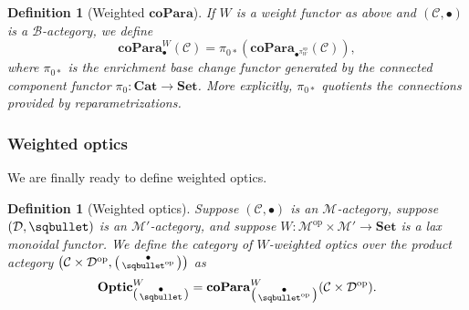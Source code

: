\documentclass[12pt,a4paper,openright,twoside]{report}
\theoremstyle{plain}
\newtheorem{definition}[proposition]{Definition}
\theoremstyle{definition}
\begin{document}
\begin{definition}[Weighted $\mathbf{coPara}$]
  If $W$ is a weight functor as above and $(\mathcal{C}, \bullet)$ is a $\mathcal{B}$-actegory, we define
  \[\mathbf{coPara}^W_{\bullet}(\mathcal{C}) = \pi_{0*}(\mathbf{coPara}_{\bullet^{\pi_W^{\mathrm{op}}}}(\mathcal{C})),\]
  where $\pi_{0*}$ is the enrichment base change functor generated by the connected component functor $\pi_{0}: \mathbf{Cat} \to \mathbf{Set}$. More explicitly, $\pi_{0*}$ quotients the connections provided by reparametrizations.
\end{definition}



\subsubsection{Weighted optics}

We are finally ready to define weighted optics.

\begin{definition}[Weighted optics]
  Suppose $(\mathcal{C}, \bullet)$ is an $\mathcal{M}$-actegory, suppose $(\mathcal{D}, \sqbullet)$ is an $\mathcal{M}'$-actegory, and suppose $W: \mathcal{M}^{\mathrm{op}} \times \mathcal{M}' \to \mathbf{Set}$ is a lax monoidal functor.
  We define the category of $W$-weighted optics over the product actegory $\left(\mathcal{C}\times\mathcal{D}^{\mathrm{op}},\left(\begin{smallmatrix}\bullet\\\sqbullet^{\mathrm{op}}\end{smallmatrix}\right)\right)$ as
  \[\mathbf{Optic}^W_{\left(\begin{smallmatrix}\bullet\\\sqbullet\end{smallmatrix}\right)} = \mathbf{coPara}^W_{\left(\begin{smallmatrix}\bullet\\\sqbullet^{\mathrm{op}}\end{smallmatrix}\right)}(\mathcal{C}\times\mathcal{D}^{\mathrm{op}}).\]
\end{definition}
\end{document}
